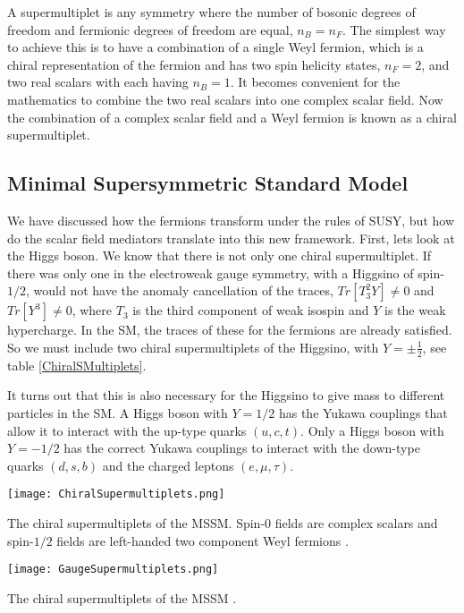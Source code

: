 A supermultiplet is any symmetry where the number of bosonic degrees of freedom and fermionic degrees of freedom are equal, $n_B=n_F$. The simplest  way to achieve this is to have a combination of a single Weyl fermion, which is a chiral representation of the fermion and has two spin helicity states, $n_F=2$, and two real scalars with each having $n_B=1$. It becomes convenient for the mathematics to combine the two real scalars into one complex scalar field. Now the combination of a complex scalar field and a Weyl fermion is known as a chiral supermultiplet. 

\subsection{Minimal Supersymmetric Standard Model}
\label{sec:MSSM}

We have discussed how the fermions transform under the rules of SUSY, but how do the scalar field mediators translate into this new framework. First, lets look at the Higgs boson. We know that there is not only one chiral supermultiplet. If there was only one in the electroweak gauge symmetry, with a Higgsino of spin-$1/2$, would not have the anomaly cancellation of the traces, $Tr[T^2_3Y]\neq0$ and $Tr[Y^3]\neq0$, where $T_3$ is the third component of weak isospin and $Y$ is the weak hypercharge. In the SM, the traces of these for the fermions are already satisfied. So we must include two chiral supermultiplets of the Higgsino, with $Y=\pm\frac{1}{2}$, see table \ref{ChiralSMultiplets}. 

It turns out that this is also necessary for the Higgsino to give mass to different particles in the SM. A Higgs boson with $Y=1/2$ has the Yukawa couplings that allow it to interact with the up-type quarks $(u, c, t)$. Only a Higgs boson with $Y=-1/2$ has the correct Yukawa couplings to interact with the down-type quarks $(d, s, b)$ and the charged leptons $(e, \mu, \tau)$.

\begin{table}
 	\centering
	\texttt{[image: ChiralSupermultiplets.png]}
 	\caption[Chiral supermultiplets for fermions and bosons]{The chiral supermultiplets of the MSSM. Spin-0 fields are complex scalars and spin-$1/2$ fields are left-handed two component Weyl fermions \cite{martin_supersymmetry_1997}.}
 	\label{ChiralSMultiplets} 
\end{table}

\begin{table}
 	\centering
	\texttt{[image: GaugeSupermultiplets.png]}
 	\caption[Chiral supermultiplets for gauge bosons]{The chiral supermultiplets of the MSSM \cite{martin_supersymmetry_1997}.}
 	\label{GaugeSMultiplets} 
\end{table}

